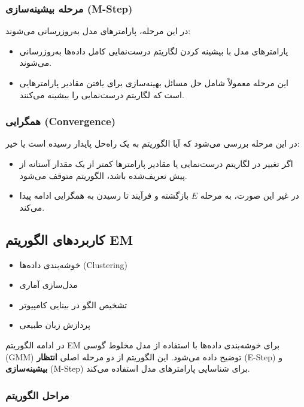\documentclass[a4paper,12pt,openany]{report}
\begin{document}
	 \subsubsection*{مرحله بیشینه‌سازی (M-Step)}
	 در این مرحله، پارامترهای مدل به‌روزرسانی می‌شوند:
	 \begin{itemize}
	 	\item پارامترهای مدل با بیشینه کردن لگاریتم درست‌نمایی کامل داده‌ها به‌روزرسانی می‌شوند.
	 	\item این مرحله معمولاً شامل حل مسائل بهینه‌سازی برای یافتن مقادیر پارامترهایی است که لگاریتم درست‌نمایی را بیشینه می‌کنند.
	 \end{itemize}
	 
	 \subsubsection*{همگرایی (Convergence)}
	 در این مرحله بررسی می‌شود که آیا الگوریتم به یک راه‌حل پایدار رسیده است یا خیر:
	 \begin{itemize}
	 	\item اگر تغییر در لگاریتم درست‌نمایی یا مقادیر پارامترها کمتر از یک مقدار آستانه از پیش تعریف‌شده باشد، الگوریتم متوقف می‌شود.
	 	\item در غیر این صورت، به مرحله \( E \) بازگشته و فرآیند تا رسیدن به همگرایی ادامه پیدا می‌کند.
	 \end{itemize}
	 
	 \subsection*{کاربردهای الگوریتم EM}
	 
	 \begin{itemize}
	 	\item خوشه‌بندی داده‌ها (Clustering)
	 	\item مدل‌سازی آماری
	 	\item تشخیص الگو در بینایی کامپیوتر
	 	\item پردازش زبان طبیعی
	 \end{itemize}
	 
	 در ادامه الگوریتم EM برای خوشه‌بندی داده‌ها با استفاده از مدل مخلوط گوسی (GMM) توضیح داده می‌شود. این الگوریتم از دو مرحله اصلی \textbf{انتظار} (E-Step) و \textbf{بیشینه‌سازی} (M-Step) برای شناسایی پارامترهای مدل استفاده می‌کند.
	 
	 \subsubsection*{مراحل الگوریتم}
	
\end{document}
